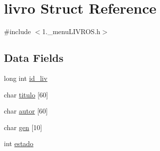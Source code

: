 \hypertarget{structlivro}{\section{livro Struct Reference}
\label{structlivro}
}


{\ttfamily \#include $<$1.\+\_\+menu\+L\+I\+V\+R\+O\+S.\+h$>$}

\subsection*{Data Fields}
\begin{DoxyCompactItemize}
\item 
long int \hyperlink{structlivro_a06dd325b1ebe2325328d3d76fae3823a}{id\+\_\+liv}
\item 
char \hyperlink{structlivro_adff70562cca95767369bccf3714e22e9}{titulo} \mbox{[}60\mbox{]}
\item 
char \hyperlink{structlivro_add9eee69a1a2bf18ad97aa2d57961845}{autor} \mbox{[}60\mbox{]}
\item 
char \hyperlink{structlivro_a81b3cc6450c77481974037c3222cb9ff}{gen} \mbox{[}10\mbox{]}
\item 
int \hyperlink{structlivro_a876d08c1d21086e4fd228744da10d028}{estado}
\end{DoxyCompactItemize}


